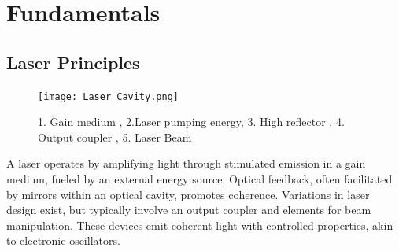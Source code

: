 \section{Fundamentals}
\label{sec:fundamentals}

\subsection{Laser Principles}
    \begin{figure}
        \centering
        \vspace{-\normalbaselineskip}
        \texttt{[image: Laser\_Cavity.png]}
        \vspace{-10pt}
        \caption{ 1. Gain medium , 2.Laser pumping energy, 3. High reflector , 4. Output coupler , 5. Laser Beam  \cite{Laser_cav} }
        
        \label{fig:lasercav}
    \end{figure}
    
    A laser operates by amplifying light through stimulated emission in a gain medium, fueled by an external energy source. 
    Optical feedback, often facilitated by mirrors within an optical cavity, promotes coherence. 
    Variations in laser design exist, but typically involve an output coupler and elements for beam manipulation. 
    These devices emit coherent light with controlled properties, akin to electronic oscillators. \\
